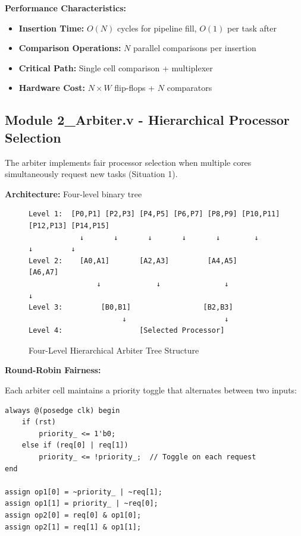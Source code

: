 \documentclass[12pt,a4paper]{article}
\begin{document}
\textbf{Performance Characteristics:}
\begin{itemize}
    \item \textbf{Insertion Time:} $O(N)$ cycles for pipeline fill, $O(1)$ per task after
    \item \textbf{Comparison Operations:} $N$ parallel comparisons per insertion
    \item \textbf{Critical Path:} Single cell comparison + multiplexer
    \item \textbf{Hardware Cost:} $N \times W$ flip-flops + $N$ comparators
\end{itemize}

\subsection{Module 2\_Arbiter.v - Hierarchical Processor Selection}

The arbiter implements fair processor selection when multiple cores simultaneously request new tasks (Situation 1).

\textbf{Architecture:} Four-level binary tree

\begin{figure}[H]
\centering
\begin{verbatim}
Level 1:  [P0,P1] [P2,P3] [P4,P5] [P6,P7] [P8,P9] [P10,P11] [P12,P13] [P14,P15]
            ↓       ↓       ↓       ↓       ↓        ↓         ↓         ↓
Level 2:    [A0,A1]       [A2,A3]         [A4,A5]           [A6,A7]
                ↓             ↓               ↓                 ↓
Level 3:         [B0,B1]                 [B2,B3]
                      ↓                       ↓
Level 4:                  [Selected Processor]
\end{verbatim}
\caption{Four-Level Hierarchical Arbiter Tree Structure}
\end{figure}

\textbf{Round-Robin Fairness:}

Each arbiter cell maintains a priority toggle that alternates between two inputs:

\begin{lstlisting}[style=verilog, caption={Fair Arbiter Cell Logic}]
always @(posedge clk) begin
    if (rst)
        priority_ <= 1'b0;
    else if (req[0] | req[1])
        priority_ <= !priority_;  // Toggle on each request
end

assign op1[0] = ~priority_ | ~req[1];
assign op1[1] = priority_ | ~req[0];
assign op2[0] = req[0] & op1[0];
assign op2[1] = req[1] & op1[1];
\end{lstlisting}
\end{document}
